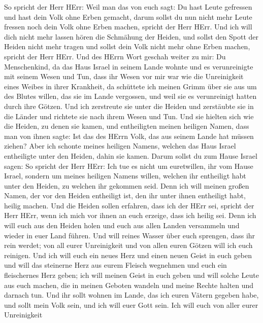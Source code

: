 So spricht der Herr HErr: Weil man das von euch sagt: Du hast Leute
gefressen und hast dein Volk ohne Erben gemacht,  darum
sollst du nun nicht mehr Leute fressen noch dein Volk ohne Erben machen,
spricht der Herr HErr.  Und ich will dich nicht mehr lassen
hören die Schmähung der Heiden, und sollst den Spott der Heiden nicht
mehr tragen und sollst dein Volk nicht mehr ohne Erben machen, spricht
der Herr HErr.  Und des HErrn Wort geschah weiter zu mir:
 Du Menschenkind, da das Haus Israel in seinem Lande wohnte
und es verunreinigte mit seinem Wesen und Tun, dass ihr Wesen vor mir
war wie die Unreinigkeit eines Weibes in ihrer Krankheit, 
da schüttete ich meinen Grimm über sie aus um des Blutes willen, das sie
im Lande vergossen, und weil sie es verunreinigt hatten durch ihre
Götzen.  Und ich zerstreute sie unter die Heiden und
zerstäubte sie in die Länder und richtete sie nach ihrem Wesen und Tun.
 Und sie hielten sich wie die Heiden, zu denen sie kamen,
und entheiligten meinen heiligen Namen, dass man von ihnen sagte: Ist
das des HErrn Volk, das aus seinem Lande hat müssen ziehen?
 Aber ich schonte meines heiligen Namens, welchen das Haus
Israel entheiligte unter den Heiden, dahin sie kamen. 
Darum sollst du zum Hause Israel sagen: So spricht der Herr HErr: Ich
tue es nicht um euretwillen, ihr vom Hause Israel, sondern um meines
heiligen Namens willen, welchen ihr entheiligt habt unter den Heiden, zu
welchen ihr gekommen seid.  Denn ich will meinen großen
Namen, der vor den Heiden entheiligt ist, den ihr unter ihnen entheiligt
habt, heilig machen. Und die Heiden sollen erfahren, dass ich der HErr
sei, spricht der Herr HErr, wenn ich mich vor ihnen an euch erzeige,
dass ich heilig sei.  Denn ich will euch aus den Heiden
holen und euch aus allen Landen versammeln und wieder in euer Land
führen.  Und will reines Wasser über euch sprengen, dass
ihr rein werdet; von all eurer Unreinigkeit und von allen euren Götzen
will ich euch reinigen.  Und ich will euch ein neues Herz
und einen neuen Geist in euch geben und will das steinerne Herz aus
eurem Fleisch wegnehmen und euch ein fleischernes Herz geben;
 ich will meinen Geist in euch geben und will solche Leute
aus euch machen, die in meinen Geboten wandeln und meine Rechte halten
und darnach tun.  Und ihr sollt wohnen im Lande, das ich
euren Vätern gegeben habe, und sollt mein Volk sein, und ich will euer
Gott sein.  Ich will euch von aller eurer Unreinigkeit
